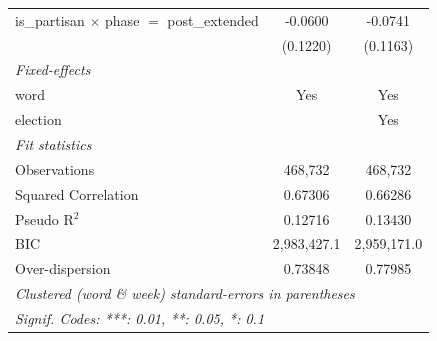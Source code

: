 \begin{tabular}{lcc}
   is\_partisan $\times$ phase $=$ post\_extended    & -0.0600        & -0.0741\\   
                                                     & (0.1220)       & (0.1163)\\   
   \midrule
   \emph{Fixed-effects}\\
   word                                              & Yes            & Yes\\  
   election                                          &                & Yes\\  
   \midrule
   \emph{Fit statistics}\\
   Observations                                      & 468,732        & 468,732\\  
   Squared Correlation                               & 0.67306        & 0.66286\\  
   Pseudo R$^2$                                      & 0.12716        & 0.13430\\  
   BIC                                               & 2,983,427.1    & 2,959,171.0\\  
   Over-dispersion                                   & 0.73848        & 0.77985\\  
   \midrule \midrule
   \multicolumn{3}{l}{\emph{Clustered (word \& week) standard-errors in parentheses}}\\
   \multicolumn{3}{l}{\emph{Signif. Codes: ***: 0.01, **: 0.05, *: 0.1}}\\
\end{tabular}
\par\endgroup



